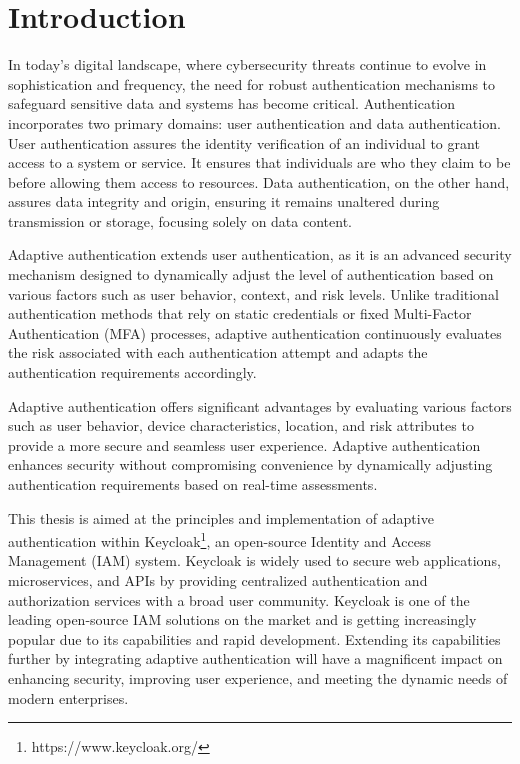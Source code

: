 \chapter{Introduction}

In today’s digital landscape, where cybersecurity threats continue to evolve in sophistication and frequency, the need for robust authentication mechanisms to safeguard sensitive data and systems has become
critical.
Authentication incorporates two primary domains: user authentication and data authentication. 
User authentication assures the identity verification of an individual to grant access to a system or service.
It ensures that individuals are who they claim to be before allowing them access to resources.
Data authentication, on the other hand, assures data integrity and origin, ensuring it remains unaltered during transmission or storage, focusing solely on data content.

Adaptive authentication extends user authentication, as it is an advanced security mechanism designed to dynamically adjust the level of authentication based on various factors such as user behavior, context, and risk levels.
Unlike traditional authentication methods that rely on static credentials or fixed Multi-Factor Authentication (MFA) processes, adaptive authentication continuously evaluates the risk associated with each authentication attempt and adapts the authentication requirements accordingly.

Adaptive authentication offers significant advantages by evaluating various factors such as user behavior, device characteristics, location, and risk attributes to provide a more secure and seamless user experience.
Adaptive authentication enhances security without compromising convenience by dynamically adjusting authentication requirements based on real-time assessments.

This thesis is aimed at the principles and implementation of adaptive authentication within Keycloak\footnote{https://www.keycloak.org/}, an open-source Identity and Access Management (IAM) system.
Keycloak is widely used to secure web applications, microservices, and APIs by providing centralized authentication and authorization services with a broad user community.\cite{keycloak-web} 
Keycloak is one of the leading open-source IAM solutions on the market and is getting increasingly popular due to its capabilities and rapid development.
Extending its capabilities further by integrating adaptive authentication will have a magnificent impact on enhancing security, improving user experience, and meeting the dynamic needs of modern enterprises.

